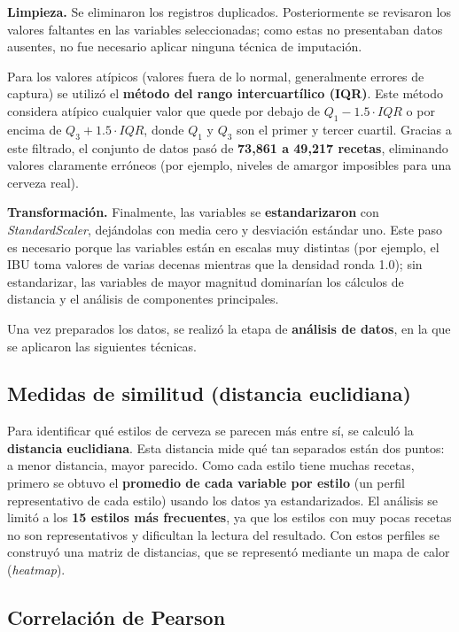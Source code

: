 \documentclass[11pt]{article}
\begin{document}
\textbf{Limpieza.} Se eliminaron los registros duplicados. Posteriormente se
revisaron los valores faltantes en las variables seleccionadas; como estas no
presentaban datos ausentes, no fue necesario aplicar ninguna técnica de imputación.

Para los valores atípicos (valores fuera de lo normal, generalmente errores de
captura) se utilizó el \textbf{método del rango intercuartílico (IQR)}. Este método
considera atípico cualquier valor que quede por debajo de $Q_1 - 1.5 \cdot IQR$ o
por encima de $Q_3 + 1.5 \cdot IQR$, donde $Q_1$ y $Q_3$ son el primer y tercer
cuartil. Gracias a este filtrado, el conjunto de datos pasó de \textbf{73{,}861 a
49{,}217 recetas}, eliminando valores claramente erróneos (por ejemplo, niveles de
amargor imposibles para una cerveza real).

\textbf{Transformación.} Finalmente, las variables se \textbf{estandarizaron} con
\textit{StandardScaler}, dejándolas con media cero y desviación estándar uno. Este
paso es necesario porque las variables están en escalas muy distintas (por ejemplo,
el IBU toma valores de varias decenas mientras que la densidad ronda 1.0); sin
estandarizar, las variables de mayor magnitud dominarían los cálculos de distancia
y el análisis de componentes principales.

Una vez preparados los datos, se realizó la etapa de \textbf{análisis de datos},
en la que se aplicaron las siguientes técnicas.

\subsection{Medidas de similitud (distancia euclidiana)}

Para identificar qué estilos de cerveza se parecen más entre sí, se calculó la
\textbf{distancia euclidiana}. Esta distancia mide qué tan separados están dos
puntos: a menor distancia, mayor parecido. Como cada estilo tiene muchas recetas,
primero se obtuvo el \textbf{promedio de cada variable por estilo} (un perfil
representativo de cada estilo) usando los datos ya estandarizados. El análisis se
limitó a los \textbf{15 estilos más frecuentes}, ya que los estilos con muy pocas
recetas no son representativos y dificultan la lectura del resultado. Con estos
perfiles se construyó una matriz de distancias, que se representó mediante un mapa
de calor (\textit{heatmap}).

\subsection{Correlación de Pearson}
\end{document}
